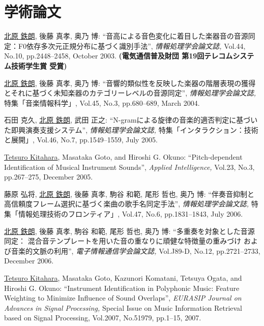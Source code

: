 \section*{学術論文}
\begin{Enumerate}
  
\item 
\underline{北原 鉄朗}, 
後藤 真孝, 
奥乃 博: 
    ``音高による音色変化に着目した楽器音の音源同定：F0依存多次元正規分布に基づく識別手法'', 
    {\it 情報処理学会論文誌,
    } Vol.44, No.10, pp.2448--2458, October 2003. 
{\bf (電気通信普及財団 第19回テレコムシステム技術学生賞 受賞)}
\item 
\underline{北原 鉄朗}, 
後藤 真孝, 
奥乃 博: 
    ``音響的類似性を反映した楽器の階層表現の獲得とそれに基づく未知楽器のカテゴリーレベルの音源同定'', 
    {\it 情報処理学会論文誌,
    } 特集「音楽情報科学」, Vol.45, No.3, pp.680--689, March 2004. 

\item 
石田 克久, 
\underline{北原 鉄朗}, 
武田 正之: 
    ``N-gramによる旋律の音楽的適否判定に基づいた即興演奏支援システム'', 
    {\it 情報処理学会論文誌,
    } 特集「インタラクション：技術と展開」, Vol.46, No.7, pp.1549--1559, July 2005. 

\item 
\underline{Tetsuro Kitahara}, 
Masataka Goto, 
and 
Hiroshi
      G. Okuno: 
    ``Pitch-dependent Identification of Musical Instrument Sounds'', 
    {\it Applied Intelligence,
    } Vol.23, No.3, pp.267--275, December 2005. 

\item 
藤原
      弘将, 
\underline{北原 鉄朗}, 
後藤
      真孝, 
駒谷
      和範, 
尾形 哲也, 
奥乃 博: 
    ``伴奏音抑制と高信頼度フレーム選択に基づく楽曲の歌手名同定手法'', 
    {\it 情報処理学会論文誌,
    } 特集「情報処理技術のフロンティア」, Vol.47, No.6, pp.1831--1843, July 2006. 

\item 
\underline{北原 鉄朗}, 
後藤
      真孝, 
駒谷
      和範, 
尾形 哲也, 
奥乃 博: 
    ``多重奏を対象とした音源同定： 混合音テンプレートを用いた音の重なりに頑健な特徴量の重みづけ および音楽的文脈の利用'', 
    {\it 電子情報通信学会論文誌,
    } Vol.J89-D, No.12, pp.2721--2733, December 2006. 

\item 
\underline{Tetsuro Kitahara}, 
Masataka Goto, 
Kazunori Komatani, 
Tetsuya
      Ogata, 
and 
Hiroshi
      G. Okuno: 
    ``Instrument Identification in Polyphonic Music: Feature Weighting to Minimize Influence of
      Sound Overlaps'', 
    {\it EURASIP Journal on Advances in Signal Processing,
    } Special Issue on Music Information Retrieval based on Signal Processing, Vol.2007, No.51979, pp.1--15, 2007. 


\end{Enumerate}
